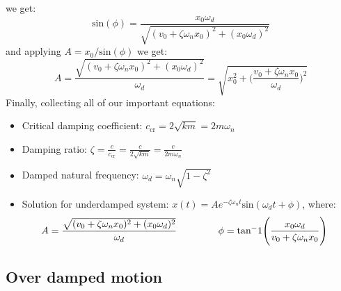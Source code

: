 \documentclass[12pt,a4paper]{article}
\begin{document}
			we get: 
			\begin{equation}
				\text{sin}(\phi) = \frac{x_0\omega_d}{\sqrt{(v_0+\zeta\omega_nx_0)^2 + (x_0\omega_d)^2}}
			\end{equation} 	
			and applying $A=x_0/\text{sin}(\phi)$ we get:
			\begin{equation}
				A = \frac{\sqrt{(v_0+\zeta\omega_nx_0)^2 + (x_0\omega_d)^2}}{\omega_d} = \sqrt{x_0^2 + \Bigg( \frac{v_0 + \zeta \omega_n x_0}{\omega_d}\Bigg)^2}
			\end{equation} 								
			Finally, collecting all of our important equations:
			\begin{itemize}
			\item Critical damping coefficient: $c_{\text{cr}} = 2\sqrt{km} = 2m\omega_n$
			\item Damping ratio: $	\zeta = \frac{c}{c_{\text{cr}}} = \frac{c}{2\sqrt{km}} = \frac{c}{2m\omega_n}$
			\item Damped natural frequency: $\omega_d = \omega_n\sqrt{1-\zeta^2}$
			\item Solution for underdamped system: $x(t) = Ae^{-\zeta\omega_nt}\text{sin}(\omega_dt + \phi)$, where: \begin{align*}
						A = \frac{\sqrt{(v_0+\zeta\omega_nx_0)^2 + (x_0\omega_d)^2}}{\omega_d} & \hspace{1.5cm} \phi = \text{tan}^-1\Bigg(\frac{x_0\omega_d}{v_0+\zeta\omega_nx_0}\Bigg) 
						\end{align*}
			\end{itemize}

		\subsection*{Over damped motion}
			
\end{document}
